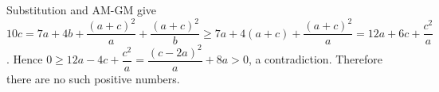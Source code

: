 Substitution and AM-GM give $10c=7a+4b+\dfrac{(a+c)^2}{a}+\dfrac{(a+c)^2}{b}\ge7a+4(a+c)+\dfrac{(a+c)^2}{a}=12a+6c+\dfrac{c^2}{a}$. Hence $0\ge12a-4c+\dfrac{c^2}{a}=\dfrac{(c-2a)^2}{a}+8a>0$, a contradiction. Therefore there are no such positive numbers.
